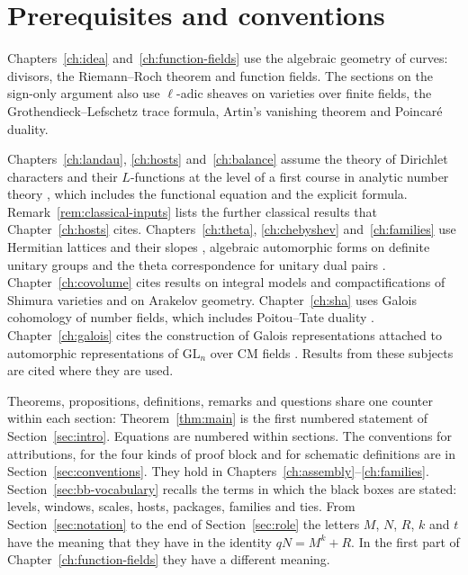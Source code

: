\documentclass[11pt]{amsbook}
\theoremstyle{plain}
\theoremstyle{definition}
\theoremstyle{remark}
\numberwithin{equation}{section}
\numberwithin{figure}{chapter}
\numberwithin{table}{chapter}
\begin{document}
\section*{Prerequisites and conventions}

Chapters~\ref{ch:idea} and~\ref{ch:function-fields} use the
algebraic geometry of curves: divisors, the Riemann--Roch theorem
and function fields. The sections on the sign-only argument also
use $\ell$-adic sheaves on varieties over finite fields, the
Grothendieck--Lefschetz trace formula, Artin's vanishing theorem
and Poincar\'e duality.

Chapters~\ref{ch:landau}, \ref{ch:hosts} and~\ref{ch:balance}
assume the theory of Dirichlet characters and their $L$-functions
at the level of a first course in analytic number theory
\cite{Davenport2000,MontgomeryVaughan2007}, which includes the
functional equation and the explicit formula.
Remark~\ref{rem:classical-inputs} lists the further classical
results that Chapter~\ref{ch:hosts} cites.
Chapters~\ref{ch:theta}, \ref{ch:chebyshev}
and~\ref{ch:families} use Hermitian lattices and their slopes
\cite{Bost1996}, algebraic automorphic forms on definite unitary
groups \cite{Gross1999} and the theta correspondence for unitary
dual pairs \cite{Howe1989,Rallis1984}. Chapter~\ref{ch:covolume}
cites results on integral models and compactifications of Shimura
varieties and on Arakelov geometry. Chapter~\ref{ch:sha} uses
Galois cohomology of number fields, which includes Poitou--Tate
duality \cite{Tate1963,Poitou1967}. Chapter~\ref{ch:galois} cites
the construction of Galois representations attached to
automorphic representations of $\mathrm{GL}_n$ over CM fields
\cite{HarrisTaylor2001,Shin2011,ChenevierHarris2013}. Results
from these subjects are cited where they are used.

Theorems, propositions, definitions, remarks and questions share
one counter within each section: Theorem~\ref{thm:main} is the
first numbered statement of Section~\ref{sec:intro}. Equations are
numbered within sections. The conventions for attributions, for
the four kinds of proof block and for schematic definitions are in
Section~\ref{sec:conventions}. They hold in
Chapters~\ref{ch:assembly}--\ref{ch:families}.
Section~\ref{sec:bb-vocabulary} recalls the terms in which the
black boxes are stated: levels, windows, scales, hosts, packages,
families and ties. From
Section~\ref{sec:notation} to the end of Section~\ref{sec:role} the
letters $M$, $N$, $R$, $k$ and $t$ have the meaning that they have
in the identity $qN=M^k+R$. In the first part of
Chapter~\ref{ch:function-fields} they have a different meaning.
\end{document}
